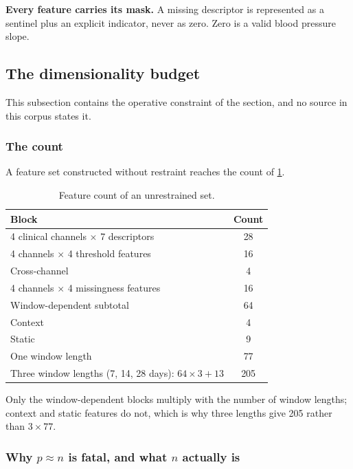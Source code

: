 \documentclass[12pt,a4paper,oneside]{report}
\begin{document}
\textbf{Every feature carries its mask.} A missing descriptor is represented as a sentinel plus an explicit indicator, never as zero. Zero is a valid blood pressure slope.

\subsection{The dimensionality budget}\label{sec:budget}

This subsection contains the operative constraint of the section, and no source in this corpus states it.

\subsubsection{The count}

A feature set constructed without restraint reaches the count of \cref{tab:dimension-count}.

\begin{table}[htbp]
\centering\small
\caption{Feature count of an unrestrained set.}\label{tab:dimension-count}
\begin{tabularx}{\textwidth}{@{}X c@{}}
\toprule
\textbf{Block} & \textbf{Count} \\
\midrule
4 clinical channels $\times$ 7 descriptors & 28 \\
4 channels $\times$ 4 threshold features & 16 \\
Cross-channel & 4 \\
4 channels $\times$ 4 missingness features & 16 \\
\midrule
Window-dependent subtotal & 64 \\
Context & 4 \\
Static & 9 \\
\midrule
One window length & 77 \\
Three window lengths (7, 14, 28 days): $64\times3 + 13$ & 205 \\
\bottomrule
\end{tabularx}
\end{table}

Only the window-dependent blocks multiply with the number of window lengths; context and static features do not, which is why three lengths give 205 rather than $3 \times 77$.

\subsubsection{Why $p \approx n$ is fatal, and what $n$ actually is}\label{sec:np}
\end{document}
